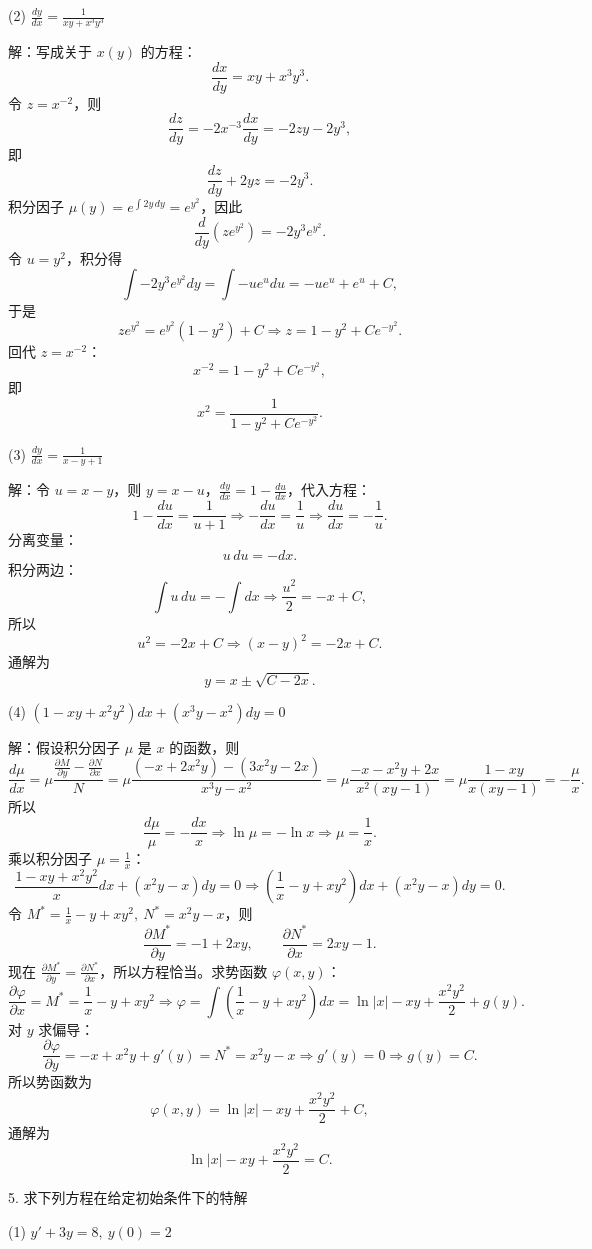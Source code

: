 (2) \(\frac{dy}{dx}=\frac{1}{xy+x^{3}y^{3}}\)

解：写成关于 \(x(y)\) 的方程：
\[ \frac{dx}{dy}=xy+x^{3}y^{3}. \]
令 \(z=x^{-2}\)，则
\[ \frac{dz}{dy}=-2x^{-3}\frac{dx}{dy}=-2zy-2y^{3}, \]
即
\[ \frac{dz}{dy}+2yz=-2y^{3}. \]
积分因子 \(\mu(y)=e^{\int2y\,dy}=e^{y^{2}}\)，因此
\[ \frac{d}{dy}\left(ze^{y^{2}}\right)=-2y^{3}e^{y^{2}}. \]
令 \(u=y^{2}\)，积分得
\[ \int-2y^{3}e^{y^{2}}dy=\int-ue^{u}du=-ue^{u}+e^{u}+C, \]
于是
\[ ze^{y^{2}}=e^{y^{2}}(1-y^{2})+C\Longrightarrow z=1-y^{2}+Ce^{-y^{2}}. \]
回代 \(z=x^{-2}\)：
\[ x^{-2}=1-y^{2}+Ce^{-y^{2}}, \]
即
\[ x^{2}=\frac{1}{1-y^{2}+Ce^{-y^{2}}}. \]

(3) \(\frac{dy}{dx}=\frac{1}{x-y+1}\)

解：令 \(u=x-y\)，则 \(y=x-u\)，\(\frac{dy}{dx}=1-\frac{du}{dx}\)，代入方程：
\[ 1-\frac{du}{dx}=\frac{1}{u+1}\Rightarrow-\frac{du}{dx}=\frac{1}{u}\Rightarrow\frac{du}{dx}=-\frac{1}{u}. \]
分离变量：
\[ u\,du=-dx. \]
积分两边：
\[ \int u\,du=-\int dx\Rightarrow\frac{u^{2}}{2}=-x+C, \]
所以
\[ u^{2}=-2x+C\Rightarrow(x-y)^{2}=-2x+C. \]
通解为
\[ y=x\pm\sqrt{C-2x}. \]

(4) \((1-xy+x^{2}y^{2})dx+(x^{3}y-x^{2})dy=0\)

解：假设积分因子 \(\mu\) 是 \(x\) 的函数，则
\[ \frac{d\mu}{dx}=\mu\frac{\frac{\partial M}{\partial y}-\frac{\partial N}{\partial x}}{N}=\mu\frac{(-x+2x^{2}y)-(3x^{2}y-2x)}{x^{3}y-x^{2}}=\mu\frac{-x-x^{2}y+2x}{x^{2}(xy-1)}=\mu\frac{1-xy}{x(xy-1)}=-\frac{\mu}{x}. \]
所以
\[ \frac{d\mu}{\mu}=-\frac{dx}{x}\Rightarrow\ln\mu=-\ln x\Rightarrow\mu=\frac{1}{x}. \]
乘以积分因子 \(\mu=\frac{1}{x}\)：
\[ \frac{1-xy+x^{2}y^{2}}{x}dx+(x^{2}y-x)dy=0\Rightarrow\left(\frac{1}{x}-y+xy^{2}\right)dx+(x^{2}y-x)dy=0. \]
令 \(M^{*}=\frac{1}{x}-y+xy^{2},\ N^{*}=x^{2}y-x\)，则
\[ \frac{\partial M^{*}}{\partial y}=-1+2xy,\qquad\frac{\partial N^{*}}{\partial x}=2xy-1. \]
现在 \(\frac{\partial M^{*}}{\partial y}=\frac{\partial N^{*}}{\partial x}\)，所以方程恰当。求势函数 \(\varphi(x,y)\)：
\[ \frac{\partial\varphi}{\partial x}=M^{*}=\frac{1}{x}-y+xy^{2}\Rightarrow\varphi=\int\left(\frac{1}{x}-y+xy^{2}\right)dx=\ln|x|-xy+\frac{x^{2}y^{2}}{2}+g(y). \]
对 \(y\) 求偏导：
\[ \frac{\partial\varphi}{\partial y}=-x+x^{2}y+g'(y)=N^{*}=x^{2}y-x\Rightarrow g'(y)=0\Rightarrow g(y)=C. \]
所以势函数为
\[ \varphi(x,y)=\ln|x|-xy+\frac{x^{2}y^{2}}{2}+C, \]
通解为
\[ \ln|x|-xy+\frac{x^{2}y^{2}}{2}=C. \]

5. 求下列方程在给定初始条件下的特解

(1) \(y'+3y=8,\ y(0)=2\)


